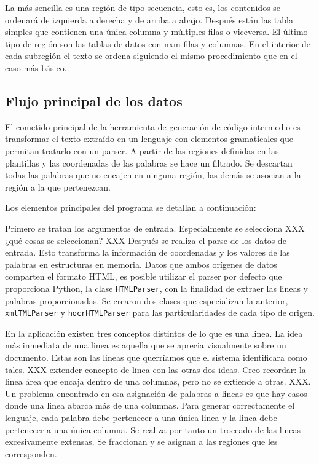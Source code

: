La más sencilla es una región de tipo secuencia, esto es, los contenidos se ordenará de izquierda a derecha y de arriba a abajo. Después están las tabla simples que contienen una única columna y múltiples filas o viceversa. El último tipo de región son las tablas de datos con nxm filas y columnas. En el interior de cada subregión el texto se ordena siguiendo el mismo procedimiento que en el caso más básico.


\subsection{Flujo principal de los datos}

El cometido principal de la herramienta de generación de código intermedio es transformar el texto extraído en un lenguaje con elementos gramaticales que permitan tratarlo con un parser. A partir de las regiones definidas en las plantillas y las coordenadas de las palabras se hace un filtrado. Se descartan todas las palabras que no encajen en ninguna región, las demás se asocian a la región a la que pertenezcan.

Los elementos principales del programa se detallan a continuación:

Primero se tratan los argumentos de entrada. Especialmente se selecciona XXX ¿qué cosas se seleccionan? XXX
Después se realiza el parse de los datos de entrada. Esto transforma la información de coordenadas y los valores de las palabras en estructuras en memoria. Datos que ambos orígenes de datos comparten el formato HTML, es posible utilizar el parser por defecto que proporciona Python, la clase \verb|HTMLParser|, con la finalidad de extraer las lineas y palabras proporcionadas. Se crearon dos clases que especializan la anterior, \verb|xmlTMLParser| y \verb|hocrHTMLParser| para las particularidades de cada tipo de origen.

En la aplicación existen tres conceptos distintos de lo que es una linea. La idea más inmediata de una linea es aquella que se aprecia visualmente sobre un documento. Estas son las lineas que querríamos que el sistema identificara como tales. XXX extender concepto de linea con las otras dos ideas. Creo recordar: la linea área que encaja dentro de una columnas, pero no se extiende a otras. XXX. Un problema encontrado en esa asignación de palabras a lineas es que hay casos donde una linea abarca más de una columnas. Para generar correctamente el lenguaje, cada palabra debe pertenecer a una única linea y la linea debe pertenecer a una única columna. Se realiza por tanto un troceado de las lineas excesivamente extensas. Se fraccionan y se asignan a las regiones que les corresponden.

